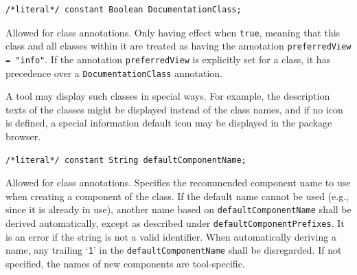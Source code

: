 \begin{annotationdefinition}[DocumentationClass]
\begin{synopsis}\begin{lstlisting}
/*literal*/ constant Boolean DocumentationClass;
\end{lstlisting}\end{synopsis}
\begin{semantics}
Allowed for class annotations.
Only having effect when \lstinline!true!, meaning that this class and all classes within it are treated as having the annotation \lstinline!preferredView = "info"!.
If the annotation \lstinline!preferredView! is explicitly set for a class, it has precedence over a \lstinline!DocumentationClass! annotation.

\begin{nonnormative}
A tool may display such classes in special ways.
For example, the description texts of the classes might be displayed instead of the class names, and if no icon is defined, a special information default icon may be displayed in the package browser.
\end{nonnormative}
\end{semantics}
\end{annotationdefinition}

\begin{annotationdefinition}[defaultComponentName]
\begin{synopsis}\begin{lstlisting}
/*literal*/ constant String defaultComponentName;
\end{lstlisting}\end{synopsis}
\begin{semantics}
Allowed for class annotations.
Specifies the recommended component name to use when creating a component of the class.
If the default name cannot be used (e.g., since it is already in use), another name based on \lstinline!defaultComponentName! shall be derived automatically, except as described under \lstinline!defaultComponentPrefixes!.
It is an error if the string is not a valid identifier.
When automatically deriving a name, any trailing `\lstinline!1!' in the \lstinline!defaultComponentName! shall be disregarded.
If not specified, the names of new components are tool-specific.
\end{semantics}
\end{annotationdefinition}

